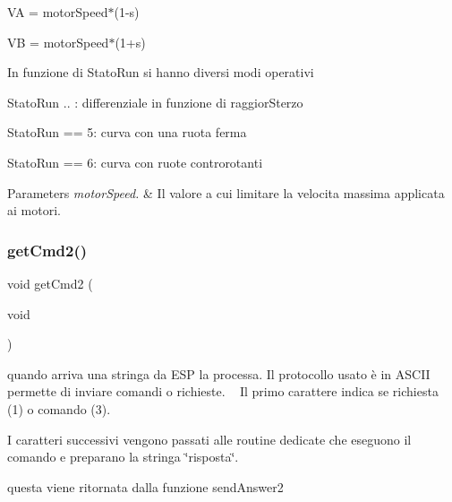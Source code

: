 VA = motor\+Speed$\ast$(1-\/s)

VB = motor\+Speed$\ast$(1+s)

In funzione di Stato\+Run si hanno diversi modi operativi

Stato\+Run .. \+: differenziale in funzione di raggior\+Sterzo

Stato\+Run == 5\+: curva con una ruota ferma

Stato\+Run == 6\+: curva con ruote controrotanti


\begin{DoxyParams}{Parameters}
{\em motor\+Speed.} & Il valore a cui limitare la velocita\textquotesingle{} massima applicata ai motori. \\
\hline
\end{DoxyParams}
\mbox{\label{ari_pi__2_d_c__esp__08_8ino_a64ea2b252b5ab59be204f70e2206ce1c}} 
\subsubsection{\texorpdfstring{get\+Cmd2()}{getCmd2()}}
{\footnotesize\ttfamily void get\+Cmd2 (\begin{DoxyParamCaption}\item[{void}]{ }\end{DoxyParamCaption})}



quando arriva una stringa da E\+SP la processa. Il protocollo usato è in A\+S\+C\+II permette di inviare comandi o richieste. ~\newline
 Il primo carattere indica se richiesta (1) o comando (3). 

I caratteri successivi vengono passati alle routine dedicate che eseguono il comando e preparano la stringa \char`\"{}risposta\char`\"{}.

questa viene ritornata dalla funzione send\+Answer2 \mbox{\label{ari_pi__2_d_c__esp__08_8ino_a23abf4b5bc87f963b0270c015e379872}} 
